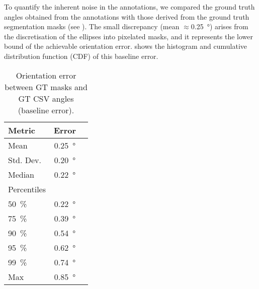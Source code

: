 To quantify the inherent noise in the annotations, we compared the ground truth angles obtained from the annotations with those derived from the ground truth segmentation masks (see ).
The small discrepancy (mean $\approx$\qty{0.25}{\degree}) arises from the discretisation of the ellipses into pixelated masks, and it represents the lower bound of the achievable orientation error.
 shows the histogram and cumulative distribution function (CDF) of this baseline error.

\begin{table}[htbp]
    \centering
    \caption{Orientation error between GT masks and GT CSV angles (baseline error).}
    \label{tab:gt_baseline_error}
    \begin{tabular}{lcc}
        \toprule
        \textbf{Metric}    & \textbf{Error}      \\
        \midrule
        Mean               & \qty{0.25}{\degree} \\
        Std. Dev.          & \qty{0.20}{\degree} \\
        Median             & \qty{0.22}{\degree} \\
        \midrule
        Percentiles        &                     \\
        \qty{50}{\percent} & \qty{0.22}{\degree} \\
        \qty{75}{\percent} & \qty{0.39}{\degree} \\
        \qty{90}{\percent} & \qty{0.54}{\degree} \\
        \qty{95}{\percent} & \qty{0.62}{\degree} \\
        \qty{99}{\percent} & \qty{0.74}{\degree} \\
        Max                & \qty{0.85}{\degree} \\
        \bottomrule
    \end{tabular}
\end{table}
